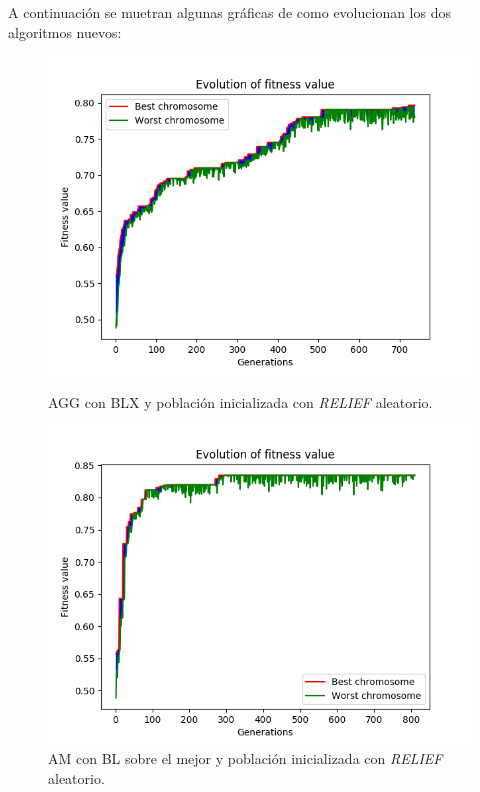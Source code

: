 \documentclass[11pt,a4paper]{article}
\begin{document}
A continuación se muetran algunas gráficas de como evolucionan los dos algoritmos nuevos:

\begin{figure}[H]
\centering
\begin{minipage}{.5\textwidth}
	\centering
	\includegraphics[scale=0.43]{img/agg-blx-relief-colposcopy.png}
	\caption{AGG con BLX y población inicializada con \textit{RELIEF} aleatorio.}
\end{minipage}%
\begin{minipage}{.5\textwidth}
	\centering
	\includegraphics[scale=0.43]{img/am-best-relief-colposcopy.png}
	\caption{AM con BL sobre el mejor y población inicializada con \textit{RELIEF} aleatorio.}
\end{minipage}
\end{figure}
\end{document}

